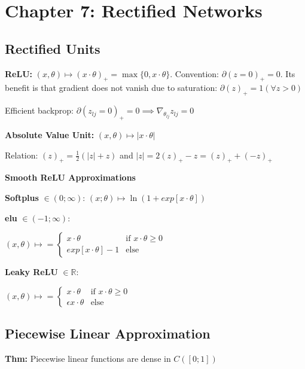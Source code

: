\section*{Chapter 7: Rectified Networks}
\subsection*{Rectified Units}
\textbf{ReLU: } $(x, \theta) \mapsto (x\cdot\theta)_{+} = \max\{0, x\cdot\theta\}$. Convention: $\partial(z=0)_+ = 0$. Its benefit is that gradient does not vanish due to saturation: $\partial (z)_+ = 1 (\forall z > 0)$

Efficient backprop: $\partial(z_{lj}=0)_+ = 0 \implies \nabla_{\theta_{lj}}z_{lj} = 0$

\textbf{Absolute Value Unit: } $(x, \theta) \mapsto |x\cdot\theta|$

Relation: $(z)_+ = \frac{1}{2}(|z|+z)$ and $|z| = 2(z)_+-z = (z)_+ + (-z)_+$

\textbf{Smooth ReLU Approximations}

\textbf{Softplus} $\in (0; \infty)$:  $(x;\theta) \mapsto \ln(1+exp[x\cdot\theta])$

\textbf{elu} $\in (-1; \infty)$: 

$
(x, \theta) \mapsto =\begin{cases}
			x\cdot\theta & \text{if } x\cdot\theta \geq 0\\
            exp[x\cdot\theta] - 1 & \text{else}
		 \end{cases}
$

\textbf{Leaky ReLU} $\in \mathbb{R}$: 

$
(x, \theta) \mapsto =\begin{cases}
			x\cdot\theta & \text{if } x\cdot\theta \geq 0\\
            \epsilon x\cdot\theta & \text{else}
		 \end{cases}
$

\subsection*{Piecewise Linear Approximation}
\textbf{Thm:} Piecewise linear functions are dense in $C([0; 1])$


